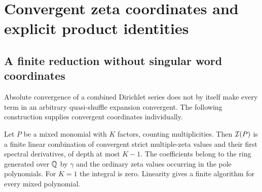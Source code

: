 \section{Convergent zeta coordinates and explicit product identities}
\label{poly:coordinates}

\subsection{A finite reduction without singular word coordinates}

Absolute convergence of a combined Dirichlet series does not by itself
make every term in an arbitrary quasi-shuffle expansion convergent.
The following construction supplies convergent coordinates individually.

\begin{theorem}
\label{poly:words}
Let $P$ be a mixed monomial with $K$ factors, counting multiplicities.
Then $\mathcal I(P)$ is a finite linear combination of convergent strict
multiple-zeta values and their first spectral derivatives, of depth at
most $K-1$. The coefficients belong to the ring generated over $\mathbb Q$
by $\gamma$ and the ordinary zeta values occurring in the pole
polynomials. For $K=1$ the integral is zero. Linearity gives a finite
algorithm for every mixed polynomial.
\end{theorem}

